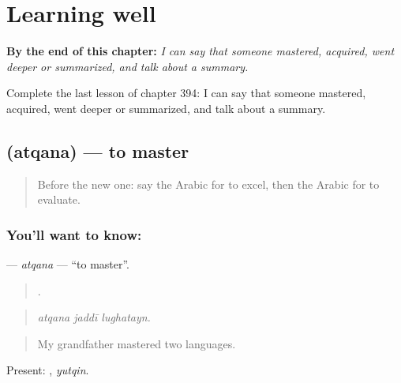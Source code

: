 
\chapter{Learning well}
\label{ch:ar-learning-well}

\begin{chapteropening}
\textbf{By the end of this chapter:} \emph{I can say that someone mastered, acquired, went deeper or summarized, and talk about a summary.}

Complete the last lesson of chapter 394: I can say that someone mastered, acquired, went deeper or summarized, and talk about a summary.
\end{chapteropening}

\section[\texorpdfstring{\ar{أتقن} (atqana)}{أتقن (atqana)}]{ (atqana) — to master}

\label{lesson:AR-C394-atqana}



\begin{quote}
Before the new one: say the Arabic for to excel, then the Arabic for to evaluate.
\end{quote}

\subsection*{You'll want to know: }
\textbf{} — \emph{atqana} — \textquotedblleft{}to master\textquotedblright{}.

\begin{quote}
  .
\end{quote}

\begin{quote}
\emph{atqana jaddī lughatayn.}
\end{quote}

\begin{quote}
My grandfather mastered two languages.
\end{quote}

Present: , \emph{yutqin}.

